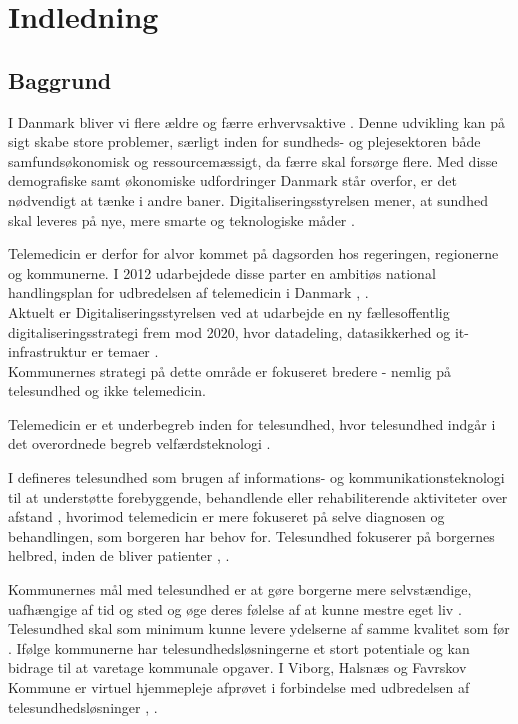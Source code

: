 \chapter{Indledning}

\section{Baggrund}
I Danmark bliver vi flere ældre og færre erhvervsaktive \cite{KL}. Denne udvikling kan på sigt skabe store problemer, særligt inden for sundheds- og plejesektoren både samfundsøkonomisk og ressourcemæssigt, da færre skal forsørge flere. Med disse demografiske samt økonomiske udfordringer Danmark står overfor, er det nødvendigt at tænke i andre baner. Digitaliseringsstyrelsen mener, at sundhed skal leveres på nye, mere smarte og teknologiske måder \cite{Digst}.    
 
Telemedicin er derfor for alvor kommet på dagsorden hos regeringen, regionerne og kommunerne. I 2012 udarbejdede disse parter en ambitiøs national handlingsplan for udbredelsen af telemedicin i Danmark \cite{Digst}, \cite{NationalH}.\\
Aktuelt er Digitaliseringsstyrelsen ved at udarbejde en ny fællesoffentlig digitaliseringsstrategi frem mod 2020, hvor datadeling, datasikkerhed og it-infrastruktur er temaer \cite{digst1}. \\
Kommunernes strategi på dette område er fokuseret bredere - nemlig på telesundhed og ikke telemedicin.

Telemedicin er et underbegreb inden for telesundhed, hvor telesundhed indgår i det overordnede begreb velfærdsteknologi \cite{KLs}.

I  defineres telesundhed som brugen af informations- og kommunikationsteknologi til at understøtte forebyggende, behandlende eller rehabiliterende aktiviteter over afstand \cite{KLs}, hvorimod telemedicin er mere fokuseret på selve diagnosen og behandlingen, som borgeren har behov for. Telesundhed fokuserer på borgernes helbred, inden de bliver patienter \cite{KLs}, \cite{sundhed}.

Kommunernes mål med telesundhed er at gøre borgerne mere selvstændige, uafhængige af tid og sted og øge deres følelse af at kunne mestre eget liv \cite{KLs}. Telesundhed skal som minimum kunne levere ydelserne af samme kvalitet som før \cite{KLs}. Ifølge kommunerne har telesundhedsløsningerne et stort potentiale og kan bidrage til at varetage kommunale opgaver. I Viborg, Halsnæs og Favrskov Kommune er virtuel hjemmepleje afprøvet i forbindelse med udbredelsen af telesundhedsløsninger \cite{viborg}, \cite{hals}. 

